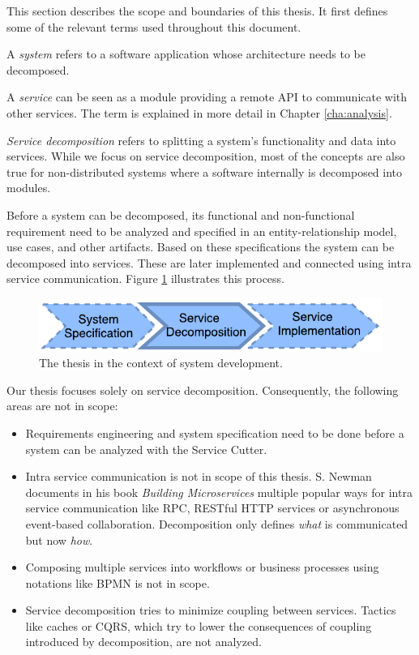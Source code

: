 This section describes the scope and boundaries of this thesis. It first defines some of the relevant terms used throughout this document.

A \textit{system} refers to a software application whose architecture needs to be decomposed.

A \textit{service} can be seen as a module providing a remote \gls{API} to communicate with other services. The term is explained in more detail in Chapter \ref{cha:analysis}.

\textit{Service decomposition} refers to splitting a system's functionality and data into services. While we focus on service decomposition, most of the concepts are also true for non-distributed systems where a software internally is decomposed into modules. 

Before a system can be decomposed, its functional and non-functional requirement need to be analyzed and specified in an entity-relationship model, use cases, and other artifacts. Based on these specifications the system can be decomposed into services. These are later implemented and connected using intra service communication. Figure \ref{fig:context} illustrates this process.

\begin{figure}[H]
	\begin{center}
		\includegraphics[scale=1.4]{diagrams/context.pdf}
	\end{center}
	\caption{The thesis in the context of system development.}
	\label{fig:context}
\end{figure}

Our thesis focuses solely on service decomposition. Consequently, the following areas are not in scope:

\begin{itemize}
	\item Requirements engineering and system specification need to be done before a system can be analyzed with the Service Cutter.
	\item Intra service communication is not in scope of this thesis. S. Newman documents in his book \textit{Building Microservices}\cite{newman2015building} multiple popular ways for intra service communication like \gls{RPC}, RESTful HTTP services or asynchronous event-based collaboration. Decomposition only defines \textit{what} is communicated but now \textit{how}. 
	\item Composing multiple services into workflows or business processes using notations like \gls{BPMN} is not in scope.
	\item Service decomposition tries to minimize coupling between services. Tactics like caches or \gls{CQRS}, which try to lower the consequences of coupling introduced by decomposition, are not analyzed. 
\end{itemize}


